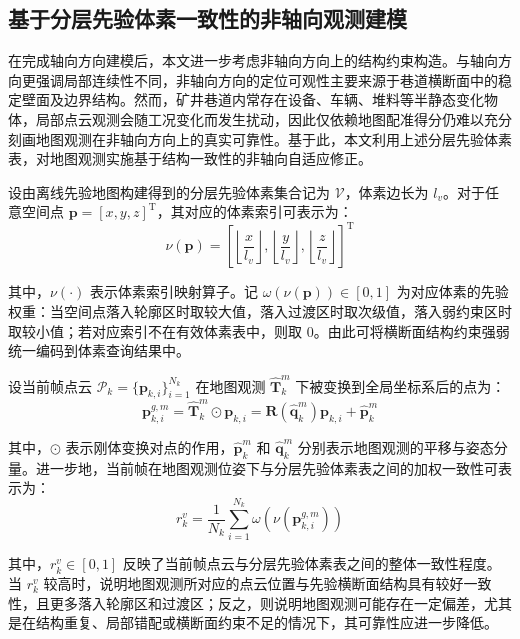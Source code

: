 \subsection{基于分层先验体素一致性的非轴向观测建模}

在完成轴向方向建模后，本文进一步考虑非轴向方向上的结构约束构造。与轴向方向更强调局部连续性不同，非轴向方向的定位可观性主要来源于巷道横断面中的稳定壁面及边界结构。然而，矿井巷道内常存在设备、车辆、堆料等半静态变化物体，局部点云观测会随工况变化而发生扰动，因此仅依赖地图配准得分仍难以充分刻画地图观测在非轴向方向上的真实可靠性。基于此，本文利用上述分层先验体素表，对地图观测实施基于结构一致性的非轴向自适应修正。

设由离线先验地图构建得到的分层先验体素集合记为 $\mathcal{V}$，体素边长为 $l_v$。对于任意空间点 $\mathbf{p}=[x,y,z]^{\mathrm T}$，其对应的体素索引可表示为：
\begin{equation}
\nu(\mathbf{p})
=
\left[
\left\lfloor \frac{x}{l_v}\right\rfloor,
\left\lfloor \frac{y}{l_v}\right\rfloor,
\left\lfloor \frac{z}{l_v}\right\rfloor
\right]^{\mathrm T}
\end{equation}

其中，$\nu(\cdot)$ 表示体素索引映射算子。记 $\omega\!\left(\nu(\mathbf{p})\right)\in[0,1]$ 为对应体素的先验权重：当空间点落入轮廓区时取较大值，落入过渡区时取次级值，落入弱约束区时取较小值；若对应索引不在有效体素表中，则取 $0$。由此可将横断面结构约束强弱统一编码到体素查询结果中。

设当前帧点云 $\mathcal{P}_{k}=\{\mathbf{p}_{k,i}\}_{i=1}^{N_k}$ 在地图观测 $\hat{\mathbf{T}}_{k}^{m}$ 下被变换到全局坐标系后的点为：
\begin{equation}
\mathbf{p}_{k,i}^{g,m}
=
\hat{\mathbf{T}}_{k}^{m}\odot \mathbf{p}_{k,i}
=
\mathbf{R}\left(\hat{\mathbf{q}}_{k}^{m}\right)\mathbf{p}_{k,i}
+\hat{\mathbf{p}}_{k}^{m}
\end{equation}

其中，$\odot$ 表示刚体变换对点的作用，$\hat{\mathbf{p}}_{k}^{m}$ 和 $\hat{\mathbf{q}}_{k}^{m}$ 分别表示地图观测的平移与姿态分量。进一步地，当前帧在地图观测位姿下与分层先验体素表之间的加权一致性可表示为：
\begin{equation}
r_{k}^{v}
=
\frac{1}{N_k}\sum_{i=1}^{N_k}\omega\!\left(\nu\left(\mathbf{p}_{k,i}^{g,m}\right)\right)
\end{equation}

其中，$r_{k}^{v}\in [0,1]$ 反映了当前帧点云与分层先验体素表之间的整体一致性程度。当 $r_{k}^{v}$ 较高时，说明地图观测所对应的点云位置与先验横断面结构具有较好一致性，且更多落入轮廓区和过渡区；反之，则说明地图观测可能存在一定偏差，尤其是在结构重复、局部错配或横断面约束不足的情况下，其可靠性应进一步降低。


